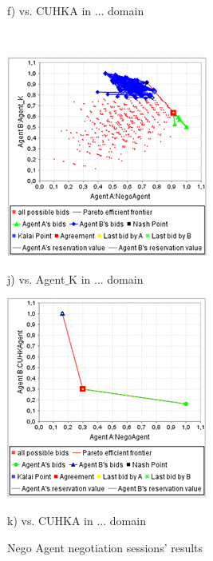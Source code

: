\documentclass[html]{report}    %
\begin{document}
\begin{figure}
\begin{minipage}{.3\textwidth}
  \caption*{f) vs. CUHKA in ... domain}
\end{minipage}\\
\begin{minipage}{.3\textwidth}
  \centering
  \includegraphics[width=.9\linewidth]{7}
  \caption*{j) vs. Agent$\_$K in ... domain}
\end{minipage}
\begin{minipage}{.3\textwidth}
  \centering
  \includegraphics[width=.9\linewidth]{8}
  \caption*{k) vs. CUHKA in ... domain}
\end{minipage}
\caption{Nego Agent negotiation sessions' results}
\label{sessionGraphs}
\end{figure}
\end{document}

